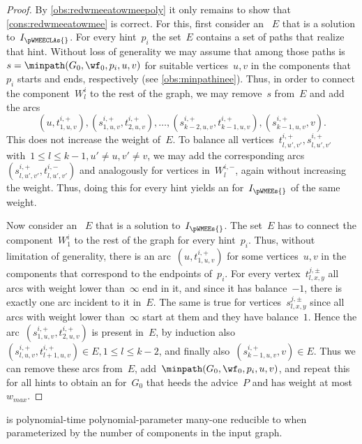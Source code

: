 \begin{proof}
  By \autoref{obs:redwmeeatowmeepoly} it only remains to show that \autoref{cons:redwmeeatowmee} is correct. For this, first consider an \EE{}~$E$ that is a solution to~$I_\pWMEECLAs{}$. For every hint~$p_i$ the set~$E$ contains a set of paths that realize that hint. Without loss of generality we may assume that among those paths is~$s = \minpath(G_0, \wf_0, p_i, u, v)$ for suitable vertices~$u, v$ in the components that~$p_i$ starts and ends, respectively (see \autoref{obs:minpathinee}). Thus, in order to connect the component~$W^i_l$ to the rest of the graph, we may remove~$s$ from~$E$ and add the arcs
\[(u, t^{i,+}_{1,u,v}), (s^{i,+}_{1,u,v}, t^{i,+}_{2,u,v}), \ldots, (s^{i,+}_{k-2,u,v}, t^{i,+}_{k-1,u,v}),(s^{i,+}_{k-1,u,v}, v) \text{.}\]
This does not increase the weight of~$E$. To balance all vertices~$t^{i,+}_{l, u', v'}, s^{i,+}_{l, u', v'}$ with~$1 \leq l \leq k - 1, u' \neq u, v' \neq v$, we may add the corresponding arcs $(s^{i,+}_{l,u', v'}, t^{i,-}_{l, u', v'})$ and analogously for vertices in~$W^{i,-}_l$, again without increasing the weight. Thus, doing this for every hint yields an \EE{} for~$I_\pWMEEs{}$ of the same weight.

Now consider an \EE{}~$E$ that is a solution to~$I_\pWMEEs{}$. The set~$E$ has to connect the component~$W^i_1$ to the rest of the graph for every hint~$p_i$. Thus, without limitation of generality, there is an arc~$(u, t^{i,+}_{1, u, v})$ for some vertices~$u, v$ in the components that correspond to the endpoints of~$p_i$. For every vertex~$t^{j,\pm}_{l, x, y}$ all arcs with weight lower than~$\infty$ end in it, and since it has balance~$-1$, there is exactly one arc incident to it in~$E$. The same is true for vertices~$s^{j,\pm}_{l, x, y}$ since all arcs with weight lower than~$\infty$ start at them and they have balance~$1$. Hence the arc~$(s^{i, +}_{1, u, v}, t^{i, +}_{2, u, v})$ is present in~$E$, by induction also~$(s^{i, +}_{l, u, v}, t^{i, +}_{l+1, u, v}) \in E, 1 \leq l \leq k-2$, and finally also~$(s^{i, +}_{k-1,u,v}, v) \in E$. Thus we can remove these arcs from~$E$, add~$\minpath(G_0, \wf_0, p_i, u, v)$, and repeat this for all hints to obtain an \EE{} for~$G_0$ that heeds the advice~$P$ and has weight at most~$w_{max}$.
\end{proof}
\begin{theorem}\label{the:redwmeeatowmee}
  \pWMEEA{} is polynomial-time polynomial-parameter many-one reducible to \pWMEE{} when parameterized by the number of components in the input graph.
\end{theorem}

